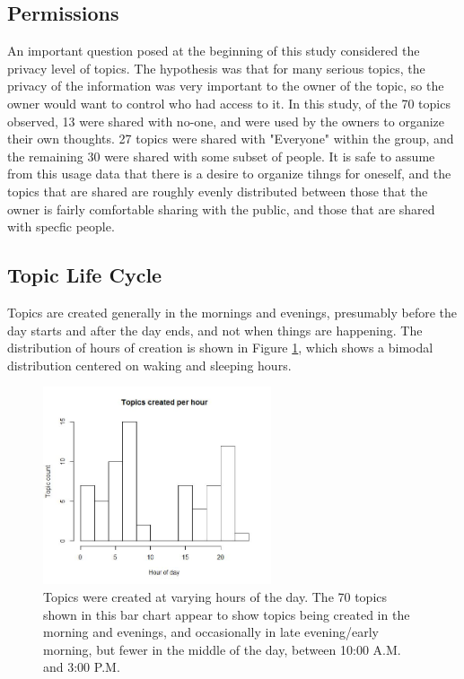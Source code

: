   \subsection{Permissions}
  An important question posed at the beginning of this study
  considered the privacy level of topics.
  The hypothesis was that for many serious topics,
  the privacy of the information was very important to the owner of the topic,
  so the owner would want to control who had access to it.
  In this study, of the 70 topics observed, 13 were shared with no-one,
  and were used by the owners to organize their own thoughts.
  27 topics were shared with "Everyone" within the group,
  and the remaining 30 were shared with some subset of people.
  It is safe to assume from this usage data that
  there is a desire to organize tihngs for oneself,
  and the topics that are shared are roughly evenly distributed
  between those that the owner is fairly comfortable sharing with the public,
  and those that are shared with specfic people.

  \subsection{Topic Life Cycle}
  Topics are created generally in the mornings and evenings,
  presumably before the day starts and after the day ends,
  and not when things are happening.
  The distribution of hours of creation is shown in
  Figure \ref{fig:topic_hours},
  which shows a bimodal distribution centered on waking and sleeping hours.

  \begin{figure}
  \centering
  \includegraphics[width=0.6\textwidth]{topics_per_hour.jpg}
  \caption[Topics Created by Hour of Day]{
    Topics were created at varying hours of the day.
    The 70 topics shown in this bar chart appear to show
    topics being created in the morning and evenings,
    and occasionally in late evening/early morning,
    but fewer in the middle of the day, between 10:00 A.M. and 3:00 P.M.
  }
  \label{fig:topic_hours}
  \end{figure}

